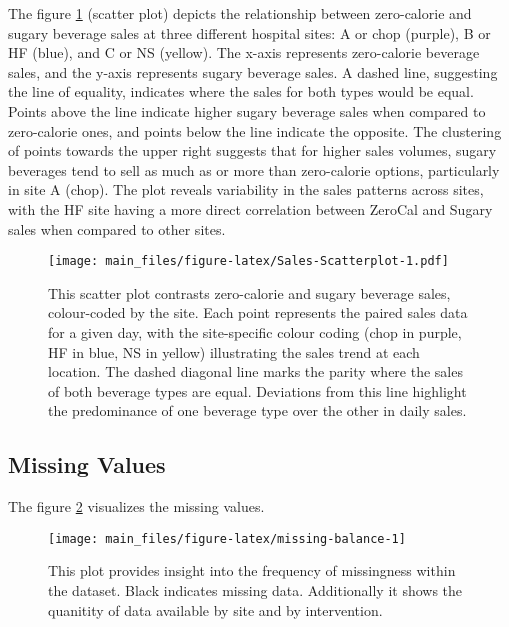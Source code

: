 \documentclass[
]{article}
\begin{document}
The figure \ref{fig:Sales-Scatterplot} (scatter plot) depicts the relationship between zero-calorie and sugary beverage sales at three different hospital sites: A or chop (purple), B or HF (blue), and C or NS (yellow). The x-axis represents zero-calorie beverage sales, and the y-axis represents sugary beverage sales. A dashed line, suggesting the line of equality, indicates where the sales for both types would be equal. Points above the line indicate higher sugary beverage sales when compared to zero-calorie ones, and points below the line indicate the opposite. The clustering of points towards the upper right suggests that for higher sales volumes, sugary beverages tend to sell as much as or more than zero-calorie options, particularly in site A (chop). The plot reveals variability in the sales patterns across sites, with the HF site having a more direct correlation between ZeroCal and Sugary sales when compared to other sites.

\begin{figure}
\centering
\texttt{[image: main\_files/figure-latex/Sales-Scatterplot-1.pdf]}
\caption{\label{fig:Sales-Scatterplot}This scatter plot contrasts zero-calorie and sugary beverage sales, colour-coded by the site. Each point represents the paired sales data for a given day, with the site-specific colour coding (chop in purple, HF in blue, NS in yellow) illustrating the sales trend at each location. The dashed diagonal line marks the parity where the sales of both beverage types are equal. Deviations from this line highlight the predominance of one beverage type over the other in daily sales.}
\end{figure}

\hypertarget{missing-values}{%
\subsection{Missing Values}\label{missing-values}}

The figure \ref{fig:missing-balance} visualizes the missing values.

\begin{figure}

{\centering \texttt{[image: main\_files/figure-latex/missing-balance-1]} 

}

\caption{This plot provides insight into the frequency of missingness within the dataset. Black indicates missing data. Additionally it shows the quanitity of data available by site and by intervention.}\label{fig:missing-balance}
\end{figure}
\end{document}
